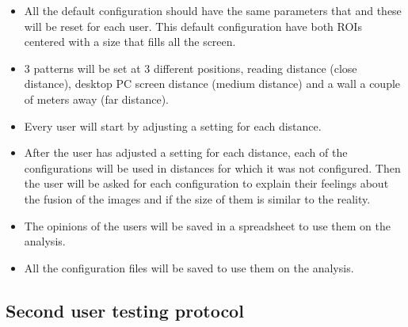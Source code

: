 \documentclass[10pt,a4paper,twocolumn,twoside]{article}
\begin{document}
	\begin{itemize}
		\item All the default configuration should have the same parameters that and these will be reset for each user. This default configuration have both ROIs centered with a size that fills all the screen. 
		
		\item 3 patterns will be set at 3 different positions, reading distance (close distance), desktop PC screen distance (medium distance) and a wall a couple of meters away (far distance).
		
		\item Every user will start by adjusting a setting for each distance. 
		
		\item After the user has adjusted a setting for each distance, each of the configurations will be used in distances for which it was not configured. Then the user will be asked for each configuration to explain their feelings about the fusion of the images and if the size of them is similar to the reality.  
		
		\item The opinions of the users will be saved in a spreadsheet to use them on the analysis. 
		
		\item All the configuration files will be saved to use them on the analysis. 
	\end{itemize}
	
	
	 
	\subsection{Second user testing protocol}
	\label{sec:annex:user2}
	
\end{document}
